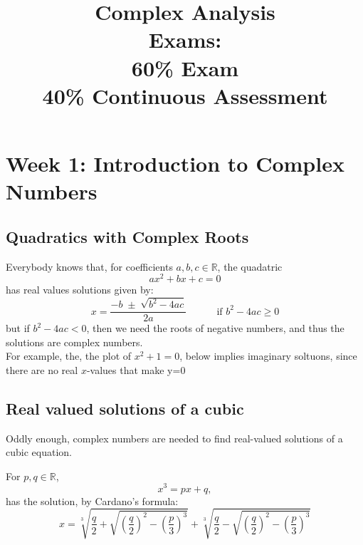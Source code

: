 \documentclass[12pt]{article}
\title{
Complex Analysis\\[2ex]
Exams:\\
60\% Exam\\
40\% Continuous Assessment
}
\author{}     %
\date{}       %
\theoremstyle{definition}
\theoremstyle{plain}
\begin{document}
\maketitle
\pagebreak

\tableofcontents
\pagebreak

\section{Week 1: Introduction to Complex Numbers}
\subsection{Quadratics with Complex Roots}
Everybody knows that, for coefficients $a,b,c \in \mathbb{R}$, the quadatric
$$ax^2 + bx +c = 0$$
has real values solutions given by:
$$x = \dfrac{-b\;\pm\;\sqrt{b^2 - 4ac}}{2a}\quad\quad\quad \text{if } b^2 -4ac \geq 0$$ 
but if $b^2 - 4ac < 0$, then we need the roots of negative numbers, and thus the solutions are complex numbers.\\
For example, the, the plot of $x^2 + 1 = 0$, below implies imaginary soltuons, since there are no real $x$-values that make y=0
\begin{center}
\end{center}
\newpage
\subsection{Real valued solutions of a cubic}
Oddly enough, complex numbers are needed to find real-valued solutions of a cubic equation.
\begin{definitionbox}
  For $p, q \in \mathbb{R}$, 
$$x^3 = px + q,$$
has the solution, by Cardano's formula:
  $$x = \sqrt[3]{\frac{q}{2} + \sqrt{\left(\frac{q}{2}\right)^2 - \left(\frac{p}{3}\right)^3}} + \sqrt[3]{\frac{q}{2} - \sqrt{\left(\frac{q}{2}\right)^2 - \left(\frac{p}{3}\right)^3}}$$
\end{definitionbox}
\end{document}
